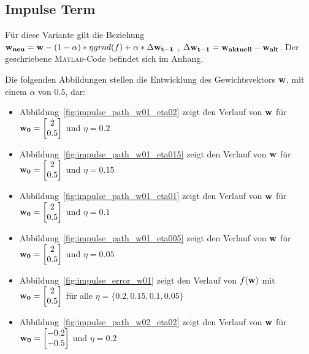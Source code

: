\subsection{Impulse Term}

Für diese Variante gilt die Beziehung $ \mathbf{w_{neu}} = \mathbf{w} - (1- \alpha)* \eta grad(f)  + \alpha * \Delta \mathbf{w_{t-1}}$ ,
 $\Delta \mathbf{w_{t-1}} = \mathbf{w_{aktuell}} - \mathbf{w_{alt}} $. Der geschriebene \textsc{Matlab}-Code befindet sich im Anhang.

Die folgenden Abbildungen stellen die Entwicklung des Gewichtsvektors $\mathbf{w}$, mit einem $\alpha$ von $0.5$, dar:

\begin{itemize}
  \item Abbildung~\ref{fig:impulse_path_w01_eta02} zeigt den Verlauf von $\mathbf{w}$ für $\mathbf{w_0} = \begin{bmatrix} 2 \\ 0.5 \end{bmatrix}$ und $\eta = 0.2$
  \item Abbildung~\ref{fig:impulse_path_w01_eta015} zeigt den Verlauf von $\mathbf{w}$ für $\mathbf{w_0} = \begin{bmatrix} 2 \\ 0.5 \end{bmatrix}$ und $\eta = 0.15$
  \item Abbildung~\ref{fig:impulse_path_w01_eta01} zeigt den Verlauf von $\mathbf{w}$ für $\mathbf{w_0} = \begin{bmatrix} 2 \\ 0.5 \end{bmatrix}$ und $\eta = 0.1$
  \item Abbildung~\ref{fig:impulse_path_w01_eta005} zeigt den Verlauf von $\mathbf{w}$ für $\mathbf{w_0} = \begin{bmatrix} 2 \\ 0.5 \end{bmatrix}$ und $\eta = 0.05$
  \item Abbildung~\ref{fig:impulse_error_w01} zeigt den Verlauf von $f(\mathbf{w})$ mit $\mathbf{w_0} = \begin{bmatrix} 2 \\ 0.5 \end{bmatrix}$ für alle $\eta = \{0.2, 0.15, 0.1, 0.05\}$
  \item Abbildung~\ref{fig:impulse_path_w02_eta02} zeigt den Verlauf von $\mathbf{w}$ für $\mathbf{w_0} = \begin{bmatrix} -0.2 \\ -0.5 \end{bmatrix}$ und $\eta = 0.2$

\end{itemize}
